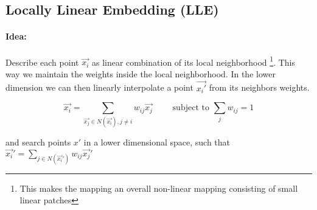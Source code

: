 

\subsection*{Locally Linear Embedding (LLE)}

\paragraph{Idea:} Describe each point \(\vec{x_i}\) as linear combination of its local neighborhood \footnote{ This makes the mapping an overall non-linear mapping consisting of small linear patches}. This way we maintain the weights inside the local neighborhood. In the lower dimension we can then linearly interpolate a point \(\vec{x_{i}'}\) from its neighbors weights.

\[\vec{x_i} = \sum_{\vec{x_j} \in N(\vec{x_i}), j \neq i} w_{ij} \vec{x_j} \qquad \text{ subject to } \sum_j w_{ij} = 1\]

and search points \(x'\) in a lower dimensional space, such that $\vec{x_i}' = \sum_{j \in N(\vec{x_i}')} w_{ij} \vec{x_j}'$

